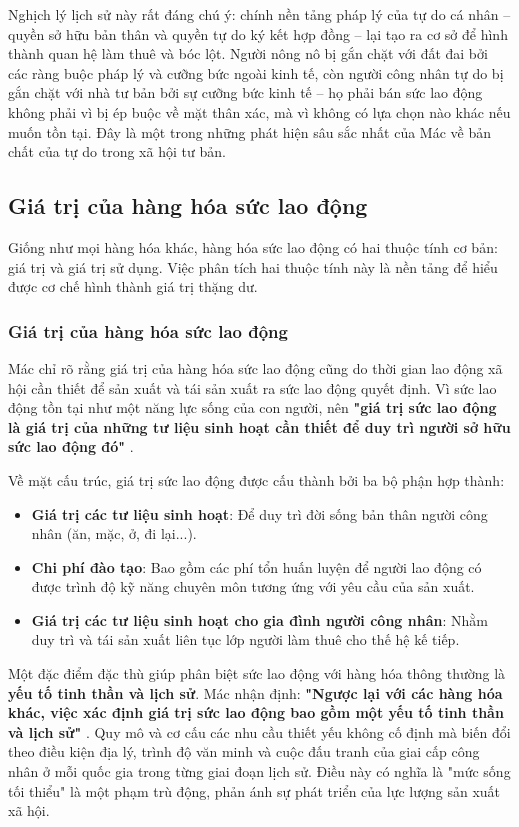 Nghịch lý lịch sử này rất đáng chú ý: chính nền tảng pháp lý của tự do cá nhân – quyền sở hữu bản thân và quyền tự do ký kết hợp đồng – lại tạo ra cơ sở để hình thành quan hệ làm thuê và bóc lột. Người nông nô bị gắn chặt với đất đai bởi các ràng buộc pháp lý và cưỡng bức ngoài kinh tế, còn người công nhân tự do bị gắn chặt với nhà tư bản bởi sự cưỡng bức kinh tế – họ phải bán sức lao động không phải vì bị ép buộc về mặt thân xác, mà vì không có lựa chọn nào khác nếu muốn tồn tại. Đây là một trong những phát hiện sâu sắc nhất của Mác về bản chất của tự do trong xã hội tư bản.

\subsection{Giá trị của hàng hóa sức lao động}
Giống như mọi hàng hóa khác, hàng hóa sức lao động có hai thuộc tính cơ bản: giá trị và giá trị sử dụng. Việc phân tích hai thuộc tính này là nền tảng để hiểu được cơ chế hình thành giá trị thặng dư.
\subsubsection{Giá trị của hàng hóa sức lao động}
Mác chỉ rõ rằng giá trị của hàng hóa sức lao động cũng do thời gian lao động xã hội cần thiết để sản xuất và tái sản xuất ra sức lao động quyết định. Vì sức lao động tồn tại như một năng lực sống của con người, nên \textbf{"giá trị sức lao động là giá trị của những tư liệu sinh hoạt cần thiết để duy trì người sở hữu sức lao động đó"} \cite[trang 283]{marx_engels_23}.

Về mặt cấu trúc, giá trị sức lao động được cấu thành bởi ba bộ phận hợp thành:
\begin{itemize}
    \item \textbf{Giá trị các tư liệu sinh hoạt}: Để duy trì đời sống bản thân người công nhân (ăn, mặc, ở, đi lại...).
    \item \textbf{Chi phí đào tạo}: Bao gồm các phí tổn huấn luyện để người lao động có được trình độ kỹ năng chuyên môn tương ứng với yêu cầu của sản xuất.
    \item \textbf{Giá trị các tư liệu sinh hoạt cho gia đình người công nhân}: Nhằm duy trì và tái sản xuất liên tục lớp người làm thuê cho thế hệ kế tiếp.
\end{itemize}
Một đặc điểm đặc thù giúp phân biệt sức lao động với hàng hóa thông thường là \textbf{yếu tố tinh thần và lịch sử}. Mác nhận định: \textbf{"Ngược lại với các hàng hóa khác, việc xác định giá trị sức lao động bao gồm một yếu tố tinh thần và lịch sử"} \cite[trang 284]{marx_engels_23}. Quy mô và cơ cấu các nhu cầu thiết yếu không cố định mà biến đổi theo điều kiện địa lý, trình độ văn minh và cuộc đấu tranh của giai cấp công nhân ở mỗi quốc gia trong từng giai đoạn lịch sử. Điều này có nghĩa là "mức sống tối thiểu" là một phạm trù động, phản ánh sự phát triển của lực lượng sản xuất xã hội.

